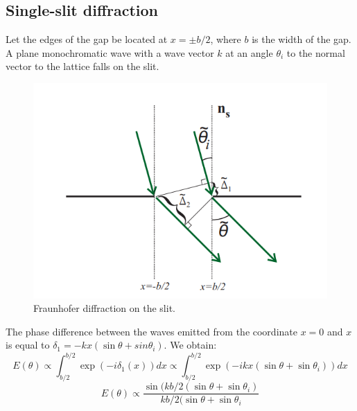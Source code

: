 \documentclass[a4paper, 12pt]{article}
\begin{document}
	\subsection*{Single-slit diffraction}
	Let the edges of the gap be located at $x = \pm b / 2$, where $b$ is the width of the gap. A plane monochromatic wave with a wave vector $k$ at an angle $\theta_i$ to the normal vector to the lattice falls on the slit.
	\begin{figure}[H]
		\centering
		\includegraphics[width=0.85\linewidth]{diff1.png}
		\caption{Fraunhofer diffraction on the slit.}
		\label{fig:1}
	\end{figure}
	The phase difference between the waves emitted from the coordinate $x = 0$ and $x$ is equal to $ \delta_1 = - k x (\sin {\theta} + sin {\theta_i})$. We obtain:
	\begin{equation}
		E(\theta) \propto \int_{b/2}^{b/2}{\exp(-i \delta_1(x))dx} \propto \int_{b/2}^{b/2}{\exp(-i k x (\sin{\theta} + \sin{\theta_i})) dx}
	\end{equation}
	\begin{equation}
		E(\theta) \propto \frac{\sin(k b / 2 (\sin{\theta} + \sin{\theta_i})}{k b / 2 (\sin{\theta} + \sin{\theta_i}}
	\end{equation}
\end{document}

